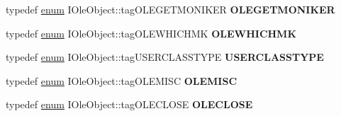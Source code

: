 \begin{DoxyCompactItemize}
typedef \hyperlink{interfaceenum}{enum} I\+Ole\+Object\+::tag\+O\+L\+E\+G\+E\+T\+M\+O\+N\+I\+K\+ER {\bfseries O\+L\+E\+G\+E\+T\+M\+O\+N\+I\+K\+ER}
\item 
\mbox{\label{interface_i_ole_object_a9d9040b19bcb8a173807b570f88de88d}} 
typedef \hyperlink{interfaceenum}{enum} I\+Ole\+Object\+::tag\+O\+L\+E\+W\+H\+I\+C\+H\+MK {\bfseries O\+L\+E\+W\+H\+I\+C\+H\+MK}
\item 
\mbox{\label{interface_i_ole_object_afda4d3fad05e3dfe941dfa24090765dc}} 
typedef \hyperlink{interfaceenum}{enum} I\+Ole\+Object\+::tag\+U\+S\+E\+R\+C\+L\+A\+S\+S\+T\+Y\+PE {\bfseries U\+S\+E\+R\+C\+L\+A\+S\+S\+T\+Y\+PE}
\item 
\mbox{\label{interface_i_ole_object_ad133cf4e144a3c1bf3df8b62547519a7}} 
typedef \hyperlink{interfaceenum}{enum} I\+Ole\+Object\+::tag\+O\+L\+E\+M\+I\+SC {\bfseries O\+L\+E\+M\+I\+SC}
\item 
\mbox{\label{interface_i_ole_object_a22fa3f299fe4ebb0ff781647cab6e714}} 
typedef \hyperlink{interfaceenum}{enum} I\+Ole\+Object\+::tag\+O\+L\+E\+C\+L\+O\+SE {\bfseries O\+L\+E\+C\+L\+O\+SE}
\end{DoxyCompactItemize}
